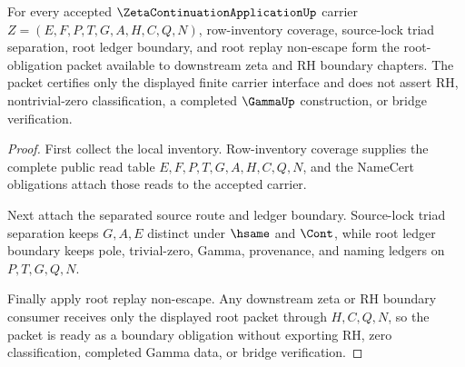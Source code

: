 \begin{theorem}
\label{thm:zeta-continuation-application-root-obligation-readiness}
For every accepted $\ZetaContinuationApplicationUp$ carrier
$Z=(E,F,P,T,G,A,H,C,Q,N)$, row-inventory coverage, source-lock triad separation,
root ledger boundary, and root replay non-escape form the root-obligation
packet available to downstream zeta and RH boundary chapters. The packet
certifies only the displayed finite carrier interface and does not assert RH,
nontrivial-zero classification, a completed $\GammaUp$ construction, or bridge
verification.
\end{theorem}
\begin{proof}
First collect the local inventory. Row-inventory coverage supplies the complete
public read table $E,F,P,T,G,A,H,C,Q,N$, and the NameCert obligations attach
those reads to the accepted carrier.

Next attach the separated source route and ledger boundary. Source-lock triad
separation keeps $G,A,E$ distinct under $\hsame$ and $\Cont$, while root ledger
boundary keeps pole, trivial-zero, Gamma, provenance, and naming ledgers on
$P,T,G,Q,N$.

Finally apply root replay non-escape. Any downstream zeta or RH boundary
consumer receives only the displayed root packet through $H,C,Q,N$, so the
packet is ready as a boundary obligation without exporting RH, zero
classification, completed Gamma data, or bridge verification.
\end{proof}

